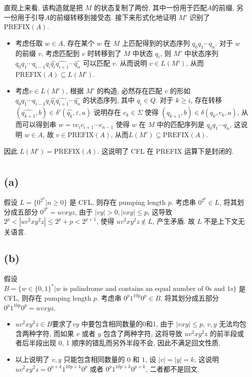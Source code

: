 \documentclass[8pt]{article}
\theoremstyle{compact}
\def\le{\leqslant}
\def\ge{\geqslant}
\begin{document}
直观上来看, 该构造就是把 $M$ 的状态复制了两份, 其中一份用于匹配$A$的前缀, 另一份用于引导$A$的前缀转移到接受态. 接下来形式化地证明 $M'$ 识别了 $\text{PREFIX}(A)$.
\begin{itemize}
	\item 考虑任取 $w \in A$, 存在某个 $w$ 在 $M$ 上匹配得到的状态序列 $q_0q_1 \cdots q_n$. 对于 $w$ 的前缀 $v$, 考虑匹配到 $v$ 时转移到了 $M$ 中状态 $q_i$, 则 $M'$ 中状态序列 $q_0q_1 \cdots q_{i-1}q_i\hat{q_i}\hat{q_{i+1}}\cdots \hat{q_n}$ 可以匹配 $v$. 从而说明 $v \in L(M')$, 从而$\text{PREFIX}(A) \subseteq L(M')$.
	\item 考虑$v \in L(M')$, 根据 $M'$ 的构造, 必然存在匹配 $v$ 的形如 $q_0q_1 \cdots q_{i-1}q_i\hat{q_i}\hat{q_{i+1}}\cdots \hat{q_n}$ 的状态序列, 其中 $q_i \in Q$. 对于 $k \ge i$, 存在转移 $(\hat{q_{k+1}}, b) \in \delta'(\hat{q_k}, \varepsilon, a)$ 说明存在 $c_k \in \Sigma$ 使得 $(q_{k+1}, b) \in \delta(q_k, c_k, a)$, 从而可以得到串 $w = vc_ic_{i+1}\cdots c_{n-1}$ 使得 $w$ 在 $M$ 中的匹配序列是 $q_0q_1 \cdots q_n$, 这说明 $w \in A$, 故 $v \in \text{PREFIX}(A)$, 从而$L(M') \subseteq \text{PREFIX}(A)$.
\end{itemize}

因此 $L(M') = \text{PREFIX}(A)$. 这说明了 CFL 在 PREFIX 运算下是封闭的.

\section{}
\subsection*{(a)}
假设 $L = \{0^{2^n} | n \ge 0\}$ 是 CFL, 则存在 pumping length $p$. 考虑串 $0^{2^p} \in L$, 将其划分成五部分 $0^{2^p} = uvxyz$, 由于 $|vy| > 0, |vxy| \le p$, 这导致 $2^{p} < |uv^2xy^2z| \le 2^p + p < 2^{p+1}$, 使得 $uv^2xy^2z \notin L$, 产生矛盾. 故 $L$ 不是上下文无关语言.

\subsection*{(b)}
假设 $B = \{w\in\{0, 1\}^* | w \text{ is palindrome and contains an equal number of 0s and 1s}\}$ 是 CFL, 则存在 pumping length $p$. 考虑串 $0^p1^{10p}0^p \in B$, 将其划分成五部分 $0^p1^{10p}0^p = uvxyz$.
\begin{itemize}
	\item $uv^2xy^2z \in B$要求了$vy$ 中要包含相同数量的0和1, 由于 $|vxy| \le p$, $v, y$ 无法均包含两种字符, 而如果 $v$ 或者 $y$ 包含了两种字符, 这将导致 $uv^2xy^2z$ 的前半段或者后半段出现 0, 1 顺序的错乱而另外半段不会, 因此不满足回文性质.
	\item 以上说明了 $v, y$ 只能包含相同数量的 $0$ 和 $1$, 设 $|v| = |y| = k$, 这说明 $uv^2xy^2z = 0^{p+k}1^{10p+k}0^p$ 或者 $0^p1^{10p+k}0^{p+k}$, 二者都不是回文.
\end{itemize}
\end{document}

